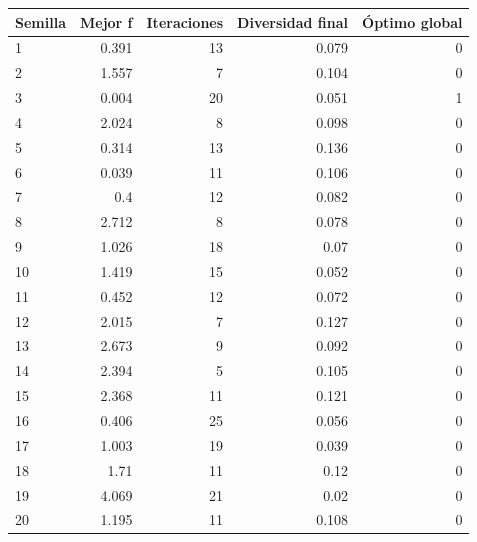 \begin{tabular}{lrrrr}
\toprule
Semilla & Mejor f & Iteraciones & Diversidad final & Óptimo global \\
\midrule
1 & 0.391 & 13 & 0.079 & 0 \\
2 & 1.557 & 7 & 0.104 & 0 \\
3 & 0.004 & 20 & 0.051 & 1 \\
4 & 2.024 & 8 & 0.098 & 0 \\
5 & 0.314 & 13 & 0.136 & 0 \\
6 & 0.039 & 11 & 0.106 & 0 \\
7 & 0.4 & 12 & 0.082 & 0 \\
8 & 2.712 & 8 & 0.078 & 0 \\
9 & 1.026 & 18 & 0.07 & 0 \\
10 & 1.419 & 15 & 0.052 & 0 \\
11 & 0.452 & 12 & 0.072 & 0 \\
12 & 2.015 & 7 & 0.127 & 0 \\
13 & 2.673 & 9 & 0.092 & 0 \\
14 & 2.394 & 5 & 0.105 & 0 \\
15 & 2.368 & 11 & 0.121 & 0 \\
16 & 0.406 & 25 & 0.056 & 0 \\
17 & 1.003 & 19 & 0.039 & 0 \\
18 & 1.71 & 11 & 0.12 & 0 \\
19 & 4.069 & 21 & 0.02 & 0 \\
20 & 1.195 & 11 & 0.108 & 0 \\
\bottomrule
\end{tabular}

